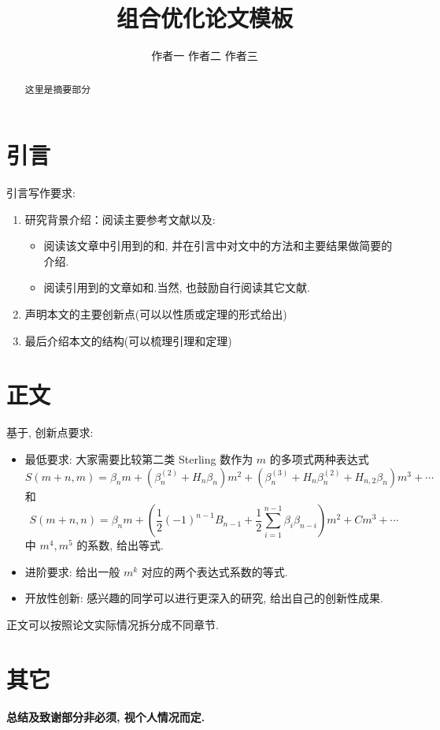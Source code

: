 \documentclass{CombPaper}
\begin{document}
\title{\heiti 组合优化论文模板}

\author{作者一 \quad 作者二 \quad 作者三}
\address{上海财经大学数学学院, 上海 200433}


\maketitle

\begin{abstract}
	这里是摘要部分
\end{abstract}

\section{引言}
引言写作要求:
\begin{enumerate}
	\item 研究背景介绍：阅读主要参考文献\cite{gessel2005miki}以及:
	\begin{itemize}
		\item 阅读该文章中引用到的\cite{miki1978relation}和\cite{Dilcher1996SumsOP}, 并在引言中对文中的方法和主要结果做简要的介绍.
		\item 阅读引用到\cite{gessel2005miki}的文章如\cite{fu2009symmetric}和\cite{dilcher2016general}.当然, 也鼓励自行阅读其它文献.
	\end{itemize}
	\item 声明本文的主要创新点(可以以性质或定理的形式给出)
	\item 最后介绍本文的结构(可以梳理引理和定理)
\end{enumerate}

\section{正文}
基于\cite{gessel2005miki}, 创新点要求:
\begin{itemize}
	\item 最低要求: 大家需要比较第二类 Sterling 数作为 $m$ 的多项式两种表达式 $$S(m+n, m)=\beta_{n} m+\left(\beta_{n}^{(2)}+H_{n} \beta_{n}\right) m^{2}+\left(\beta_{n}^{(3)}+H_{n} \beta_{n}^{(2)}+H_{n, 2} \beta_{n}\right) m^{3}+\cdots$$ 和 $$S(m+n, n)=\beta_{n} m+\left(\frac{1}{2}(-1)^{n-1} B_{n-1}+\frac{1}{2} \sum_{i=1}^{n-1} \beta_{i} \beta_{n-i}\right) m^{2}+C m^{3}+\cdots$$ 中 $m^4, m^5$ 的系数, 给出等式.
	\item 进阶要求: 给出一般 $m^k$ 对应的两个表达式系数的等式.
	\item 开放性创新: 感兴趣的同学可以进行更深入的研究, 给出自己的创新性成果. 
\end{itemize}

正文可以按照论文实际情况拆分成不同章节. 

\section{其它}
\textbf{总结及致谢部分非必须, 视个人情况而定.}



\end{document}
